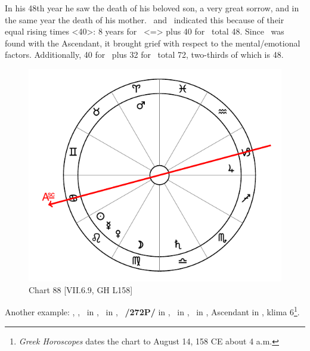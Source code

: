 In his 48th year he saw the death of his beloved son, a very great sorrow, and in the same year the death of his mother. \Virgo\, and \Libra\, indicated this because of their equal rising times <40>: 8 years for \Libra\, <=\Venus> plus 40 for \Virgo\, total 48. Since \Mars\, was found with the Ascendant, it brought grief with respect to the mental/emotional factors. Additionally, 40 for \Virgo\, plus 32 for \Sagittarius\, total 72, two-thirds of which is 48.

\newpage

\begin{figure}
\centering
\vspace{0pt}
\includegraphics[width=.68\textwidth]{charts/7_6_09}
\caption{Chart 88 [VII.6.9, GH L158] }
\label{fig:chart88}
\end{figure} 

Another example: \Sun, \Mercury, \Venus\, in \Leo, \Moon\, in \Virgo, \Saturn\, \textbf{/272P/} in \Libra, \Jupiter\, in \Capricorn, \Mars\, in \Aries, Ascendant in \Cancer, klima 6\footnote{\textit{Greek Horoscopes} dates the chart to August 14, 158 CE about 4 a.m.}.

